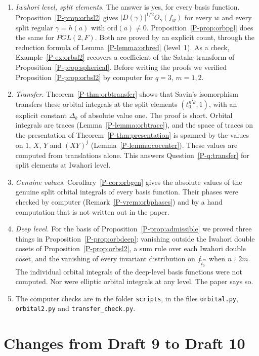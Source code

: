 \documentclass[12pt,letterpaper]{amsart}
\newcommand{\fbar}{\overline{f}}
\begin{document}
\begin{enumerate}[leftmargin=1.5em]
\item \emph{Iwahori level, split elements.} The answer is yes, for every
basis function. Proposition~\ref{P-prop:orbsl2} gives
$|D(\gamma)|^{1/2}O_\gamma(f_w)$ for every $w$ and every split regular
$\gamma=h(a)$ with $\mathrm{ord}(a)\neq0$. Proposition~\ref{P-prop:orbpgl} does
the same for $PGL(2,F)$. Both are proved by an explicit count, through
the reduction formula of Lemma~\ref{P-lemma:orbred} (level~1). As a
check, Example~\ref{P-ex:orbsl2} recovers a coefficient of the Satake
transform of Proposition~\ref{P-prop:spherical}. Before writing the
proofs we verified Proposition~\ref{P-prop:orbsl2} by computer for
$q=3$, $m=1,2$.
\item \emph{Transfer.} Theorem~\ref{P-thm:orbtransfer} shows that
Savin's isomorphism transfers these orbital integrals at the split
elements $(t_0^{n'k},1)$, with an explicit constant $\Delta_k$ of
absolute value one. The proof is short. Orbital integrals are traces
(Lemma~\ref{P-lemma:orbtrace}), and the space of traces on the
presentation of Theorem~\ref{P-thm:presentation} is spanned by the
values on $1$, $X$, $Y$ and $(XY)^j$ (Lemma~\ref{P-lemma:cocenter}).
These values are computed from translations alone. This answers
Question~\ref{P-q:transfer} for split elements at Iwahori level.
\item \emph{Genuine values.} Corollary~\ref{P-cor:orbgen} gives the
absolute values of the genuine split orbital integrals of every basis
function. Their phases were checked by computer
(Remark~\ref{P-vrem:orbphases}) and by a hand computation that is not
written out in the paper.
\item \emph{Deep level.} For the basis of
Proposition~\ref{P-prop:admissible} we proved three things in
Proposition~\ref{P-prop:orbdeep}: vanishing outside the Iwahori double
cosets of Proposition~\ref{P-prop:orbsl2}, a sum rule over each Iwahori
double coset, and the vanishing of every invariant distribution on
$\fbar_{\tilde t_0^m}$ when $n\nmid 2m$. The individual orbital
integrals of the deep-level basis functions were not computed. Nor were
elliptic orbital integrals at any level. The paper says so.
\item The computer checks are in the folder \texttt{scripts}, in the
files \texttt{orbital.py}, \texttt{orbital2.py} and
\texttt{transfer\_check.py}.
\end{enumerate}

\section{Changes from Draft 9 to Draft 10}
\label{sec:d9d10}
\end{document}

